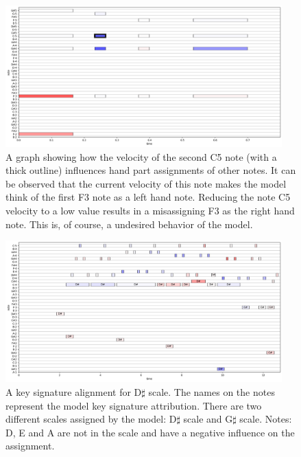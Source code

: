 \begin{figure}[!ht]
\centering
\includegraphics[width=0.95\textwidth]{images/lime_hand_part.png}
\caption[A graph showing how the velocity of a note influences hand part assignments of other notes]{A graph showing how the velocity of the second C5 note (with a thick outline) influences hand part assignments of other notes. It can be observed that the current velocity of this note makes the model think of the first F3 note as a left hand note. Reducing the note C5 velocity to a low value results in a misassigning F3 as the right hand note. This is, of course, a undesired behavior of the model.}
\label{hand_part_misalignment}\end{figure}

\begin{figure}[!ht]
\centering
\includegraphics[width=0.95\textwidth]{images/note_removing.png}
\caption[A key signature alignment for D$\sharp$ scale]{A key signature alignment for D$\sharp$ scale. The names on the notes represent the model key signature attribution. There are two different scales assigned by the model: D$\sharp$ scale and G$\sharp$ scale. Notes: D, E and A are not in the scale and have a negative influence on the assignment.}
\label{note_removing}\end{figure}
